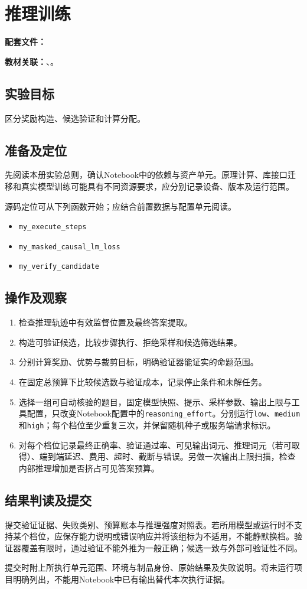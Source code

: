\chapter{推理训练}
\label{lab:A30_reasoning_model}

\noindent\textbf{配套文件：}\par
\noindent\textbf{教材关联：}、。

\section*{实验目标}
区分奖励构造、候选验证和计算分配。

\section*{准备及定位}
先阅读本册实验总则，确认Notebook中的依赖与资产单元。原理计算、库接口迁移和真实模型训练可能具有不同资源要求，应分别记录设备、版本及运行范围。

源码定位可从下列函数开始；应结合前置数据与配置单元阅读。
\begin{itemize}
\item \texttt{my\_execute\_steps}
\item \texttt{my\_masked\_causal\_lm\_loss}
\item \texttt{my\_verify\_candidate}
\end{itemize}

\section*{操作及观察}
\begin{enumerate}
\item 检查推理轨迹中有效监督位置及最终答案提取。
\item 构造可验证候选，比较步骤执行、拒绝采样和候选筛选结果。
\item 分别计算奖励、优势与裁剪目标，明确验证器能证实的命题范围。
\item 在固定总预算下比较候选数与验证成本，记录停止条件和未解任务。
\item 选择一组可自动核验的题目，固定模型快照、提示、采样参数、输出上限与工具配置，只改变Notebook配置中的\texttt{reasoning\_effort}。分别运行\texttt{low}、\texttt{medium}和\texttt{high}；每个档位至少重复三次，并保留随机种子或服务端请求标识。
\item 对每个档位记录最终正确率、验证通过率、可见输出词元、推理词元（若可取得）、端到端延迟、费用、超时、截断与错误。另做一次输出上限扫描，检查内部推理增加是否挤占可见答案预算。
\end{enumerate}

\section*{结果判读及提交}
提交验证证据、失败类别、预算账本与推理强度对照表。若所用模型或运行时不支持某个档位，应保存能力说明或错误响应并将该组标为不适用，不能静默换档。验证器覆盖有限时，通过验证不能外推为一般正确；候选一致与外部可验证性不同。

提交时附上所执行单元范围、环境与制品身份、原始结果及失败说明。将未运行项目明确列出，不能用Notebook中已有输出替代本次执行证据。
